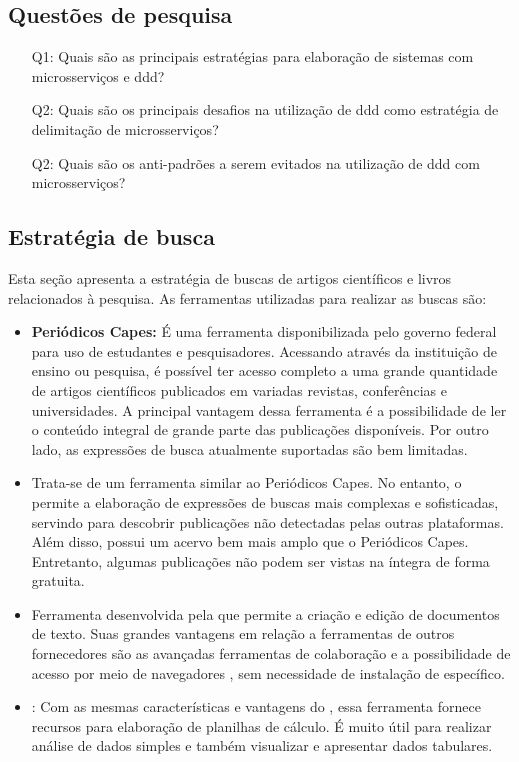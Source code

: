 \subsection{Questões de pesquisa}
\label{section:questoes_pesquisa}
\begin{enumerate}
    \item[Q1:] Quais são as principais estratégias para elaboração de sistemas com microsserviços e \acrshort{ddd}?
    \item[Q2:] Quais são os principais desafios na utilização de \acrshort{ddd} como estratégia de delimitação de microsserviços?
    \item[Q2:] Quais são os anti-padrões a serem evitados na utilização de \acrshort{ddd} com microsserviços?
    
\end{enumerate}

\subsection{Estratégia de busca}
Esta seção apresenta a estratégia de buscas de artigos científicos e livros relacionados à pesquisa. As ferramentas utilizadas para realizar as buscas são:
\begin{itemize}
    \item \textbf{Periódicos Capes:} É uma ferramenta disponibilizada pelo governo federal para uso de estudantes e pesquisadores. Acessando através da instituição de ensino ou pesquisa, é possível ter acesso completo a uma grande quantidade de artigos científicos publicados em variadas revistas, conferências e universidades. A principal vantagem dessa ferramenta é a possibilidade de ler o conteúdo integral de grande parte das publicações disponíveis. Por outro lado, as expressões de busca atualmente suportadas são bem limitadas.
    \item \textbf{} Trata-se de um ferramenta similar ao Periódicos Capes. No entanto, o  permite a elaboração de expressões de buscas mais complexas e sofisticadas, servindo para descobrir publicações não detectadas pelas outras plataformas. Além disso, possui um acervo bem mais amplo que o Periódicos Capes. Entretanto, algumas publicações não podem ser vistas na íntegra de forma gratuita.
    \item \textbf{} Ferramenta desenvolvida pela  que permite a criação e edição de documentos de texto. Suas grandes vantagens em relação a ferramentas de outros fornecedores são as avançadas ferramentas de colaboração e a possibilidade de acesso por meio de navegadores , sem necessidade de instalação de  específico.
    \item \textbf{}: Com as mesmas características e vantagens do , essa ferramenta fornece recursos para elaboração de planilhas de cálculo. É muito útil para realizar análise de dados simples e também visualizar e apresentar dados tabulares.
\end{itemize}

